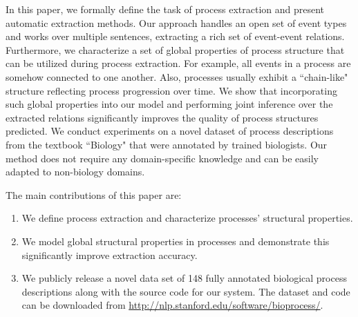 
In this paper, we formally define the task of process extraction and present automatic extraction methods. 
Our approach handles an open set of event types and works over multiple sentences, extracting a rich set of event-event relations.
Furthermore, we characterize a set of global properties of process structure that can be utilized during process extraction. 
For example, all events in a process are somehow connected to one another. Also, processes usually exhibit a ``chain-like" structure reflecting process progression over time. 
We show that incorporating such global properties into our model and performing joint inference over the extracted relations significantly improves the quality of process structures predicted.  
We conduct experiments on a novel dataset of process descriptions from the textbook ``Biology" \cite{CampbellReece} that were annotated by trained biologists. Our method does not require any domain-specific knowledge and can be easily adapted to non-biology domains.

The main contributions of this paper are:
\begin{enumerate} [itemsep=0pt] 
\item We define process extraction and characterize processes' structural properties.
\item We model global structural properties in processes and demonstrate this significantly improve extraction accuracy.
\item We publicly release a novel data set of 148 fully annotated biological process descriptions along with the source code for our system. The dataset and code can be downloaded from \small{\url{http://nlp.stanford.edu/software/bioprocess/}}.
\end{enumerate}
